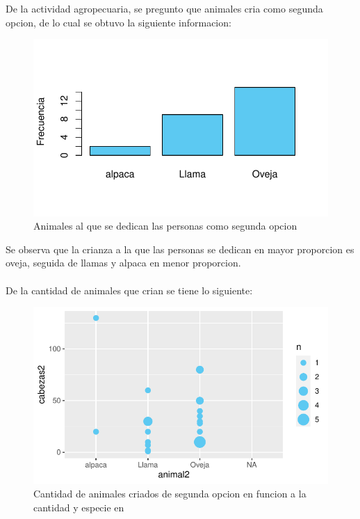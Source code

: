 \documentclass[12pt]{article}\usepackage[]{graphicx}\usepackage[]{xcolor}
\makeatletter
\def\maxwidth{ %
  \ifdim\Gin@nat@width>\linewidth
    \linewidth
  \else
    \Gin@nat@width
  \fi
}
\newenvironment{kframe}{%
 \def\at@end@of@kframe{}%
 \ifinner\ifhmode%
  \def\at@end@of@kframe{\end{minipage}}%
  \begin{minipage}{\columnwidth}%
 \fi\fi%
 \def\FrameCommand##1{\hskip\@totalleftmargin \hskip-\fboxsep
 \colorbox{shadecolor}{##1}\hskip-\fboxsep
     \hskip-\linewidth \hskip-\@totalleftmargin \hskip\columnwidth}%
 \MakeFramed {\advance\hsize-\width
   \@totalleftmargin\z@ \linewidth\hsize
   \@setminipage}}%
 {\par\unskip\endMakeFramed%
 \at@end@of@kframe}
\newenvironment{knitrout}{}{} %
\makeatother
\begin{document}
	
	De la actividad agropecuaria, se pregunto que animales cria como segunda opcion, de lo cual se obtuvo la siguiente informacion:
	\begin{figure}[H]
	\centering
\begin{knitrout}
\color{fgcolor}
\includegraphics[width=\maxwidth]{figure/eighteen-1} 
\end{knitrout}
	\caption{Animales al que se dedican las personas como segunda opcion}
	\end{figure}
	Se observa que la crianza a la que las personas se dedican en mayor proporcion es oveja, seguida de llamas y alpaca en menor proporcion.\\
	\\
	De la cantidad de animales que crian se tiene lo siguiente:
	\begin{figure}[H]
	\centering
\begin{knitrout}
\color{fgcolor}\begin{kframe}


{\ttfamily\noindent\color{warningcolor}{\#\# Warning: Removed 7 rows containing non-finite values (`stat\_sum()`).}}\end{kframe}
\includegraphics[width=\maxwidth]{figure/nineteen-1} 
\end{knitrout}
	\caption{Cantidad de animales criados de segunda opcion en funcion a la cantidad y especie en \comunidad}
	\end{figure}
	
\end{document}
